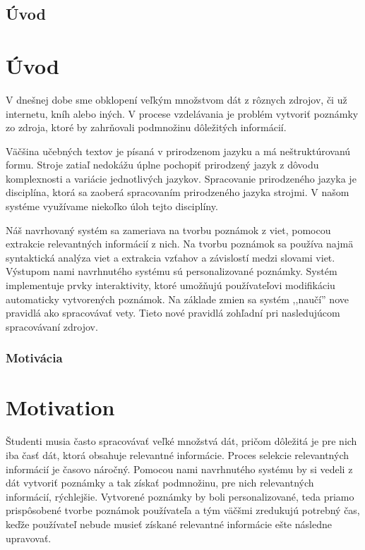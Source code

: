 \newpage
{}
{
	\section{Úvod}
}
{
	\chapter{Úvod}
}
V dnešnej dobe sme obklopení veľkým množstvom dát z rôznych zdrojov, či už internetu, kníh alebo iných. V procese vzdelávania je problém vytvoriť poznámky zo zdroja, ktoré by zahrňovali podmnožinu dôležitých informácií. 

Väčšina učebných textov je písaná v prirodzenom jazyku a má neštruktúrovanú formu. Stroje zatiaľ nedokážu úplne pochopiť prirodzený jazyk z dôvodu komplexnosti a variácie jednotlivých jazykov. Spracovanie prirodzeného jazyka je disciplína, ktorá sa zaoberá spracovaním prirodzeného jazyka strojmi. V našom systéme využívame niekoľko úloh tejto disciplíny.

Náš navrhovaný systém sa zameriava na tvorbu poznámok z viet, pomocou extrakcie relevantných informácií z nich. Na tvorbu poznámok sa používa najmä syntaktická analýza viet a extrakcia vzťahov a závislostí medzi slovami viet. Výstupom nami navrhnutého systému sú personalizované poznámky. Systém implementuje prvky interaktivity, ktoré umožňujú používateľovi modifikáciu automaticky vytvorených poznámok. Na základe zmien sa systém ,,naučí'' nove pravidlá ako spracovávať vety. Tieto nové pravidlá zohľadní pri nasledujúcom spracovávaní zdrojov.

{
	\subsection{Motivácia}
}
{
	\chapter{Motivation}
}
Študenti musia často spracovávať veľké množstvá dát, pričom dôležitá je pre nich iba časť dát, ktorá obsahuje relevantné informácie. Proces selekcie relevantných informácií je časovo náročný. Pomocou nami navrhnutého systému by si vedeli z dát vytvoriť poznámky a tak získať podmnožinu, pre nich relevantných informácií, rýchlejšie. Vytvorené poznámky by boli personalizované, teda priamo prispôsobené tvorbe poznámok používateľa a tým väčšmi zredukujú potrebný čas, keďže používateľ nebude musieť získané  relevantné informácie ešte následne upravovať.

